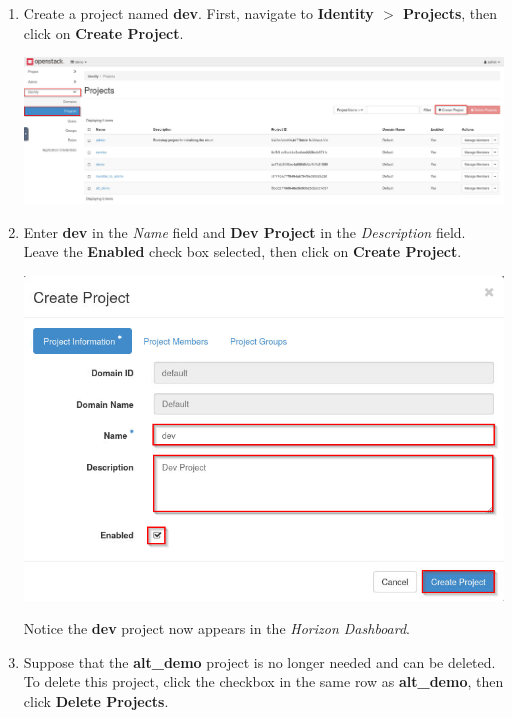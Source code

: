\documentclass[letterpaper, 12pt]{article}
\begin{document}
\begin{enumerate}
    \item Create a project named \textbf{dev}. First, navigate to \textbf{Identity $>$ Projects}, then click on
    \textbf{Create Project}.

    \begin{center}
        \includegraphics[width=\linewidth]{images/part1/step5.png}
    \end{center}

    \item Enter \textbf{dev} in the \textit{Name} field and \textbf{Dev Project} in the \textit{Description} field.
    Leave the \textbf{Enabled} check box selected, then click on \textbf{Create Project}.

    \begin{center}
        \includegraphics[width=\linewidth]{images/part1/step6.png}
    \end{center}

    \begin{notebox}
        Notice the \textbf{dev} project now appears in the \textit{Horizon Dashboard}.
    \end{notebox}

    \item Suppose that the \textbf{alt\_demo} project is no longer needed and can be deleted. To delete this project,
    click the checkbox in the same row as \textbf{alt\_demo}, then click \textbf{Delete Projects}.


\end{enumerate}
\end{document}

